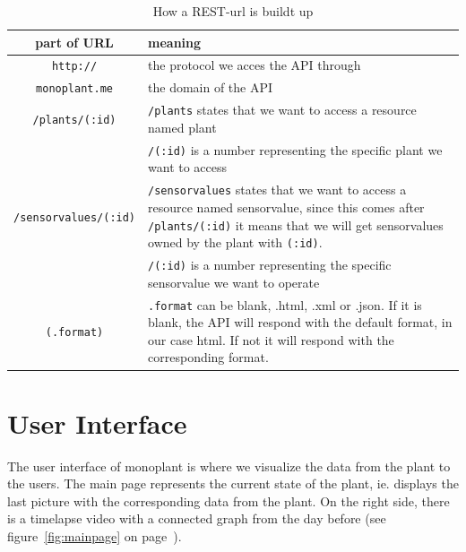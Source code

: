 \bgroup
\def\arraystretch{1.8}	%
\begin{table}
	\centering
	\begin{tabular}{|c|p{250pt}|} \hline
		\textbf{part of URL}&	\textbf{meaning}\\ \hline
		\texttt{http://}&	the protocol we acces the API through\\ \hline
		\texttt{monoplant.me}&	the domain of the API\\ \hline
		\texttt{/plants/(:id)}&	\texttt{/plants} states that we want to access a resource named plant \\ &
		\texttt{/(:id)} is a number representing the specific plant we want to access\\ \hline
		\texttt{/sensorvalues/(:id)}&	\texttt{/sensorvalues} states that we want to access a resource named sensorvalue, since this comes after \texttt{/plants/(:id)} it means that we will get sensorvalues owned by the plant with \texttt{(:id)}. \\ &
		\texttt{/(:id)} is a number representing the specific sensorvalue we want to operate\\ \hline
		\texttt{(.format)}&	 \texttt{.format} can be blank, .html, .xml or .json. If it is blank, the API will respond with the default format, in our case html. If not it will respond with the corresponding format.\\ \hline
	\end{tabular}
	\caption{How a REST-url is buildt up}
	\label{fig:RESTurl}
\end{table}
\egroup

\section{User Interface}
The user interface of monoplant is where we visualize the data from the plant to the users. The main page represents the current state of the plant, ie. displays the last picture with the corresponding data from the plant. On the right side, there is a timelapse video with a connected graph from the day before (see figure~\ref{fig:mainpage} on page~\pageref{fig:mainpage}).

